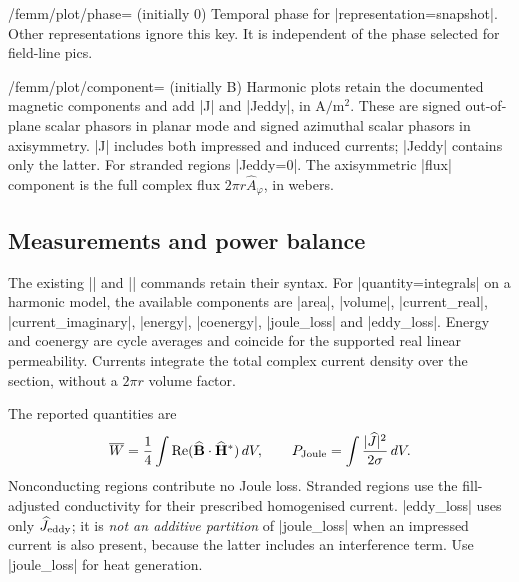 \begin{key}{/femm/plot/phase= (initially 0)}
Temporal phase for |representation=snapshot|. Other representations ignore
this key. It is independent of the phase selected for field-line pics.
\end{key}

\begin{key}{/femm/plot/component= (initially B)}
Harmonic plots retain the documented magnetic components and add |J| and
|Jeddy|, in $\mathrm{A/m^2}$. These are signed out-of-plane scalar phasors in
planar mode and signed azimuthal scalar phasors in axisymmetry. |J| includes
both impressed and induced currents; |Jeddy| contains only the latter.
For stranded regions |Jeddy=0|. The axisymmetric |flux| component is the full
complex flux $2\pi r\widehat A_\varphi$, in webers.
\end{key}

\subsection{Measurements and power balance}
The existing |\femmselect| and |\femmmeasure| commands retain their syntax.
For |quantity=integrals| on a harmonic model, the available components are
|area|, |volume|, |current_real|, |current_imaginary|, |energy|, |coenergy|,
|joule_loss| and |eddy_loss|. Energy and coenergy are cycle averages and coincide
for the supported real linear permeability. Currents integrate the total
complex current density over the section, without a $2\pi r$ volume factor.
\begin{codeexample}
\femmselect[name=tube,material=solid copper]
\femmmeasure[name=tube-loss,selection=tube]
\end{codeexample}
The reported quantities are
\[
 \overline W=\frac14\int\mathop{\rm Re}
  (\widehat{\mathbf B}\mathbin{\cdot}\widehat{\mathbf H}^{*})\,dV,
 \qquad
 P_{\rm Joule}=\int\frac{|\widehat J|^2}{2\sigma}\,dV.
\]
Nonconducting regions contribute no Joule loss. Stranded regions use the
fill-adjusted conductivity for their prescribed homogenised current.
|eddy_loss| uses only $\widehat J_{\rm eddy}$; it is \emph{not an additive
partition} of |joule_loss| when an impressed current is also present, because
the latter includes an interference term. Use |joule_loss| for heat generation.

